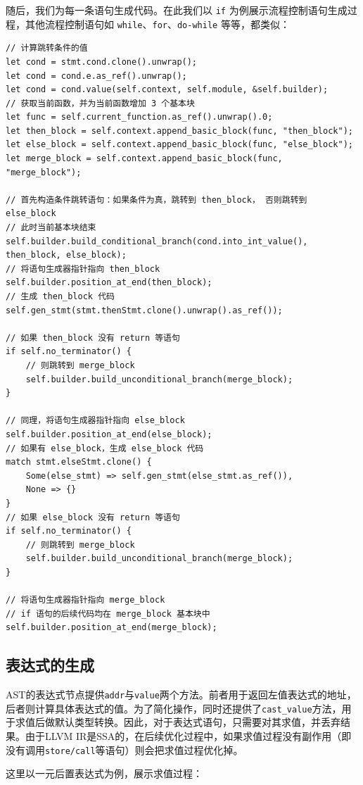 \documentclass{ctexrep}
\begin{document}
随后，我们为每一条语句生成代码。在此我们以 \texttt{if} 为例展示流程控制语句生成过程，其他流程控制语句如 \texttt{while}、\texttt{for}、\texttt{do-while} 等等，都类似：
\begin{verbatim}
// 计算跳转条件的值
let cond = stmt.cond.clone().unwrap();
let cond = cond.e.as_ref().unwrap();
let cond = cond.value(self.context, self.module, &self.builder);
// 获取当前函数，并为当前函数增加 3 个基本块
let func = self.current_function.as_ref().unwrap().0;
let then_block = self.context.append_basic_block(func, "then_block");
let else_block = self.context.append_basic_block(func, "else_block");
let merge_block = self.context.append_basic_block(func, "merge_block");

// 首先构造条件跳转语句：如果条件为真，跳转到 then_block， 否则跳转到 else_block
// 此时当前基本块结束
self.builder.build_conditional_branch(cond.into_int_value(), then_block, else_block);
// 将语句生成器指针指向 then_block
self.builder.position_at_end(then_block);
// 生成 then_block 代码
self.gen_stmt(stmt.thenStmt.clone().unwrap().as_ref());

// 如果 then_block 没有 return 等语句
if self.no_terminator() {
    // 则跳转到 merge_block
    self.builder.build_unconditional_branch(merge_block);
}

// 同理，将语句生成器指针指向 else_block
self.builder.position_at_end(else_block);
// 如果有 else_block，生成 else_block 代码
match stmt.elseStmt.clone() {
    Some(else_stmt) => self.gen_stmt(else_stmt.as_ref()),
    None => {}
}
// 如果 else_block 没有 return 等语句
if self.no_terminator() {
    // 则跳转到 merge_block
    self.builder.build_unconditional_branch(merge_block);
}

// 将语句生成器指针指向 merge_block
// if 语句的后续代码均在 merge_block 基本块中
self.builder.position_at_end(merge_block);
\end{verbatim}

\subsection{表达式的生成}
AST的表达式节点提供\texttt{addr}与\texttt{value}两个方法。前者用于返回左值表达式的地址，后者则计算具体表达式的值。为了简化操作，同时还提供了\texttt{cast\_value}方法，用于求值后做默认类型转换。因此，对于表达式语句，只需要对其求值，并丢弃结果。由于LLVM IR是SSA的，在后续优化过程中，如果求值过程没有副作用（即没有调用\texttt{store/call}等语句）则会把求值过程优化掉。

这里以一元后置表达式为例，展示求值过程：
\end{document}
